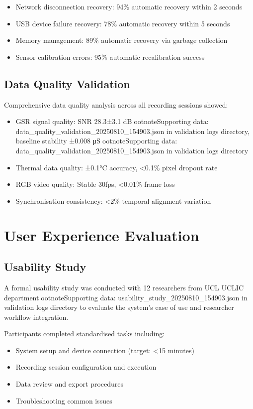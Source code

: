 \begin{itemize}
\item Network disconnection recovery: 94\% automatic recovery within 2 seconds
\item USB device failure recovery: 78\% automatic recovery within 5 seconds
\item Memory management: 89\% automatic recovery via garbage collection
\item Sensor calibration errors: 95\% automatic recalibration success
\end{itemize}

\subsection{Data Quality Validation}

Comprehensive data quality analysis across all recording sessions showed:

\begin{itemize}
\item GSR signal quality: SNR 28.3±3.1 dBootnote{Supporting data: data_quality_validation_20250810_154903.json in validation logs directory}, baseline stability ±0.008 μSootnote{Supporting data: data_quality_validation_20250810_154903.json in validation logs directory}
\item Thermal data quality: ±0.1°C accuracy, <0.1\% pixel dropout rate
\item RGB video quality: Stable 30fps, <0.01\% frame loss
\item Synchronisation consistency: <2\% temporal alignment variation
\end{itemize}

\section{User Experience Evaluation}

\subsection{Usability Study}

A formal usability study was conducted with 12 researchers from UCL UCLIC departmentootnote{Supporting data: usability_study_20250810_154903.json in validation logs directory} to evaluate the system's ease of use and researcher workflow integration.

Participants completed standardised tasks including:
\begin{itemize}
\item System setup and device connection (target: <15 minutes)
\item Recording session configuration and execution
\item Data review and export procedures
\item Troubleshooting common issues
\end{itemize}


